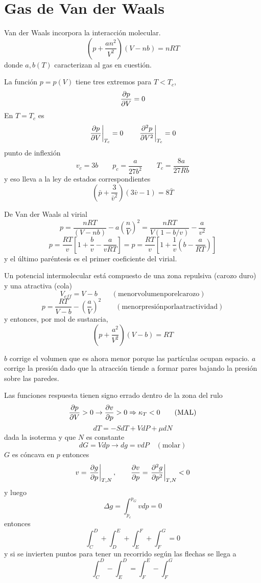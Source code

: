 \documentclass[10pt,oneside]{CBFT_book}
\begin{document}
\section{Gas de Van der Waals}

Van der Waals incorpora la interacción molecular. 
\[
	\left( p +\frac{an^2}{V^2} \right)(V- nb) = nRT
\]
donde $a,b(T)$ caracterizan al gas en cuestión.

La función $p=p(V)$ tiene tres extremos para $T<T_c$,
\[
	\dpar{p}{V} = 0
\]
En $T=T_c$ es
\[
	\left.\dpar{p}{V} \right|_{T_c} = 0 \qquad \left.\dpar[2]{p}{V} \right|_{T_c} = 0
\]
punto de inflexión
\[
	v_c = 3b \qquad p_c = \frac{a}{27b^2} \qquad T_c = \frac{8a}{27Rb}
\]
y eso lleva a la ley de estados correspondientes
\[
	\left( \bar{p} + \frac{3}{\bar{v}^2} \right)(3 \bar{v} - 1)= 8\bar{T}
\]

De Van der Waals al virial
\[
	p = \frac{nRT}{(V-nb)} - a \left(\frac{n}{V} \right)^2 = 
	\frac{nRT}{V(1-b/v)}- \frac{a}{v^2}
\]
\[
	p = \frac{RT}{v}\left[ 1 + \frac{b}{v} - \frac{a}{vRT} \right] =
	p = \frac{RT}{v}\left[ 1 + \frac{1}{v}\left( b - \frac{a}{RT} \right) \right]
\]
y el último paréntesis es el primer coeficiente del virial.

Un potencial intermolecular está compuesto de una zona repulsiva (carozo duro) y una atractiva (cola)
\[
	V_{eff} = V-b \qquad (\mathrm{menor volumen por el carozo})
\]
\[
	p = \frac{RT}{V-b} - \left(\frac{a}{V}\right)^2 \qquad (\mathrm{menor presión por la atractividad})
\]
y entonces, por mol de sustancia,
\[
	\left( p +\frac{a^2}{V^2} \right)(V- b)= RT
\]

$b$ corrige el volumen que es ahora menor porque las partículas ocupan espacio. $a$ corrige la presión dado que la 
atracción tiende a formar pares bajando la presión sobre las paredes.

Las funciones respuesta tienen signo errado dentro de la zona del rulo
\[
	\dpar{p}{V}>0 \rightarrow  \dpar{v}{p} >0 \Rightarrow \kappa_T < 0 \qquad (\mathrm{MAL})
\]
\[
	dT = -SdT + VdP + \mu dN
\]
dada la isoterma y que $N$ es constante 
\[
	dG = Vdp \rightarrow dg = v dP \quad (\mathrm{molar})
\]
$G$ es cóncava en $p$ entonces 
\[
	v = \left.\dpar{g}{p} \right|_{T,N}, \qquad  
	\dpar{v}{p} =\left.\dpar[2]{g}{p} \right|_{T,N} < 0
\]
y luego 
\[
	\Delta g = \int_{p_c}^{p_G} v dp = 0
\]
entonces 
\[
	\int_C^D + \int_D^E + \int_E^F + \int_F^G = 0
\]
y si se invierten puntos para tener un recorrido según las flechas se llega a 
\[
	\int_C^D - \int_E^D = \int_F^E - \int_F^G 
\]
\end{document}
